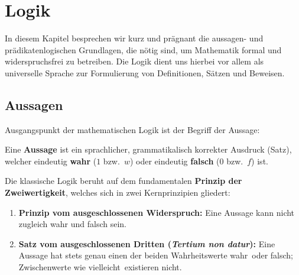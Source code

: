 
\section{Logik}


In diesem Kapitel besprechen wir kurz und prägnant die aussagen- und prädikatenlogischen Grundlagen, die nötig sind, um Mathematik formal und widerspruchsfrei zu betreiben. Die Logik dient uns hierbei vor allem als universelle Sprache zur Formulierung von Definitionen, Sätzen und Beweisen.

\subsection{Aussagen}

Ausgangspunkt der mathematischen Logik ist der Begriff der Aussage:

\begin{definition}[Aussage]
Eine \textbf{Aussage} ist ein sprachlicher, grammatikalisch korrekter Ausdruck (Satz), welcher eindeutig \textbf{wahr} ($1$ bzw.\ $w$) oder eindeutig \textbf{falsch} ($0$ bzw.\ $f$) ist.
\end{definition}

Die klassische Logik beruht auf dem fundamentalen \textbf{Prinzip der Zweiwertigkeit}, welches sich in zwei Kernprinzipien gliedert:
\begin{enumerate}
    \item \textbf{Prinzip vom ausgeschlossenen Widerspruch:} Eine Aussage kann nicht zugleich wahr und falsch sein.
    \item \textbf{Satz vom ausgeschlossenen Dritten (\textit{Tertium non datur}):} Eine Aussage hat stets genau einen der beiden Wahrheitswerte \glqq wahr\grqq\ oder \glqq falsch\grqq; Zwischenwerte wie \glqq vielleicht\grqq\ existieren nicht.
\end{enumerate}

